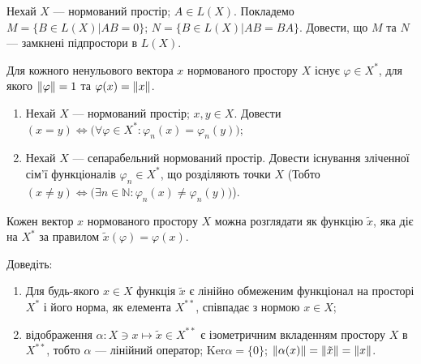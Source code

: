 \begin{exercise}
    Нехай $X$ --- нормований простір; $A \in L(X)$. Покладемо $M = \{B \in L(X) | AB=0\}$;
    $N = \{B \in L(X) | AB=BA\}$. Довести, що $M$ та $N$ --- замкнені підпростори в $L(X)$.
\end{exercise}

\begin{theory}
    \begin{theorem*}
        Для кожного ненульового вектора $x$ нормованого простору $X$ існує $\varphi \in X^*$,
        для якого $\left\lVert\varphi\right\rVert = 1$ та $\varphi(x) = \left\lVert x\right\rVert$. 
    \end{theorem*}
\end{theory}

\begin{exercise} 
    \begin{enumerate}[label=\ukr*)]
        \item Нехай $X$ --- нормований простір; $x,y \in X$. Довести $(x=y) \Leftrightarrow 
        \big(\forall\varphi \in X^*: \varphi_n(x) = \varphi_n(y)\big)$;
        \item Нехай $X$ --- сепарабельний нормований простір. Довести існування зліченної сім'ї
        функціоналів $\varphi_n \in X^*$, що розділяють точки $X$ \Big(Тобто 
        $(x\neq y) \Leftrightarrow \big(\exists n \in \mathbb{N}: \varphi_n(x) \neq \varphi_n(y)\big)$\Big).
    \end{enumerate}
\end{exercise}

\begin{theory}
    Кожен вектор $x$ нормованого простору $X$ можна розглядати як функцію $\tilde{x}$, яка 
    діє на $X^*$ за правилом $\tilde{x}(\varphi)=\varphi(x)$.
\end{theory}

\begin{exercise}
    Доведіть:~
    \begin{enumerate}[label=\ukr*)]
        \item Для будь-якого $x \in X$ функція $\tilde{x}$ є лінійно обмеженим функціонал на просторі $X^*$
        і його норма, як елемента $X^{**}$, співпадає з нормою $x \in X$;
        \item відображення $\alpha: X \ni x \mapsto \tilde{x} \in X^{**}$ є ізометричним вкладенням
        простору $X$ в $X^{**}$, тобто $\alpha$ --- лінійний оператор; $\mathrm{Ker}\alpha = \{0\}$; 
        $\left\lVert\alpha(x)\right\rVert = \left\lVert\tilde{x}\right\rVert = \left\lVert x\right\rVert$.
    \end{enumerate}
\end{exercise}


